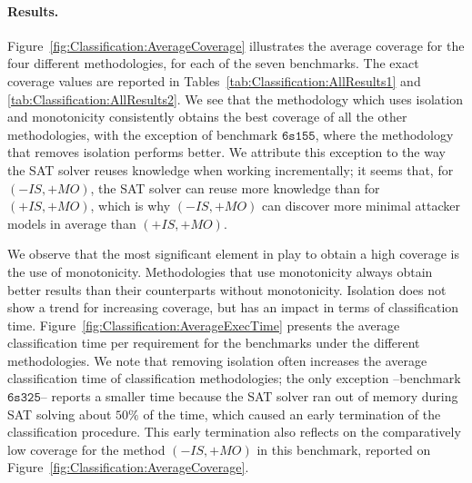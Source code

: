 \paragraph{Results.} Figure~\ref{fig:Classification:AverageCoverage} illustrates the average coverage for the four different methodologies, for each of the seven benchmarks. The exact coverage values are reported in Tables~\ref{tab:Classification:AllResults1} and \ref{tab:Classification:AllResults2}. We see that the methodology which uses isolation and monotonicity consistently obtains the best coverage of all the other methodologies, with the exception of benchmark $\mathtt{6s155}$, where the methodology that removes isolation performs better. We attribute this exception to the way the SAT solver reuses knowledge when working incrementally; it seems that, for $(-IS,+MO)$, the SAT solver can reuse more knowledge than for $(+IS,+MO)$, which is why $(-IS,+MO)$ can discover more minimal attacker models in average than $(+IS,+MO)$. 

We observe that the most significant element in play to obtain a high coverage is the use of monotonicity. Methodologies that use monotonicity always obtain better results than their counterparts without monotonicity. Isolation does not show a trend for increasing coverage, but has an impact in terms of classification time. Figure~\ref{fig:Classification:AverageExecTime} presents the average classification time per requirement for the benchmarks under the different methodologies. We note that removing isolation often increases the average classification time of classification methodologies; the only exception --benchmark $\mathtt{6s325}$-- reports a smaller time because the SAT solver ran out of memory during SAT solving about $50\%$ of the time, which caused an early termination of the classification procedure. This early termination also reflects on the comparatively low coverage for the method $(-IS,+MO)$ in this benchmark, reported on Figure~\ref{fig:Classification:AverageCoverage}.

